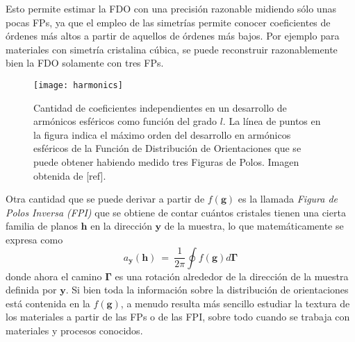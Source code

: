 Esto permite estimar la FDO con una precisión razonable midiendo sólo unas pocas FPs, ya que el empleo de las simetrías permite conocer coeficientes de órdenes más altos a partir de aquellos de órdenes más bajos. 
Por ejemplo para materiales con simetría cristalina cúbica, se puede reconstruir razonablemente bien la FDO solamente con tres FPs.
\begin{figure}[!htb]
  \centering
  \texttt{[image: harmonics]}
  \caption{Cantidad de coeficientes independientes en un desarrollo de armónicos esféricos como función del grado $l$. La línea de puntos en la figura indica el máximo orden del desarrollo en armónicos esféricos de la Función de Distribución de Orientaciones que se puede obtener habiendo medido tres Figuras de Polos. Imagen obtenida de [ref].}
  \label{fig:harmonics}
\end{figure}

Otra cantidad que se puede derivar a partir de $f(\mathbf{g})$ es la llamada \textit{Figura de Polos Inversa (FPI)} que se obtiene de contar cuántos cristales tienen una cierta familia de planos $\mathbf{h}$ en la dirección $\mathbf{y}$ de la muestra, lo que matemáticamente se expresa como
\begin{equation}
  a_{\mathbf{y}}(\mathbf{h}) \ = \ \frac{1}{2 \pi} \oint f(\mathbf{g}) d\mathbf{\Gamma}
  \label{eq:IPF}
\end{equation}
\noindent
donde ahora el camino $\mathbf{\Gamma}$ es una rotación alrededor de la dirección de la muestra definida por $\mathbf{y}$.
Si bien toda la información sobre la distribución de orientaciones está contenida en la $f(\mathbf{g})$, a menudo resulta más sencillo estudiar la textura de los materiales a partir de las FPs o de las FPI, sobre todo cuando se trabaja con materiales y procesos conocidos.

